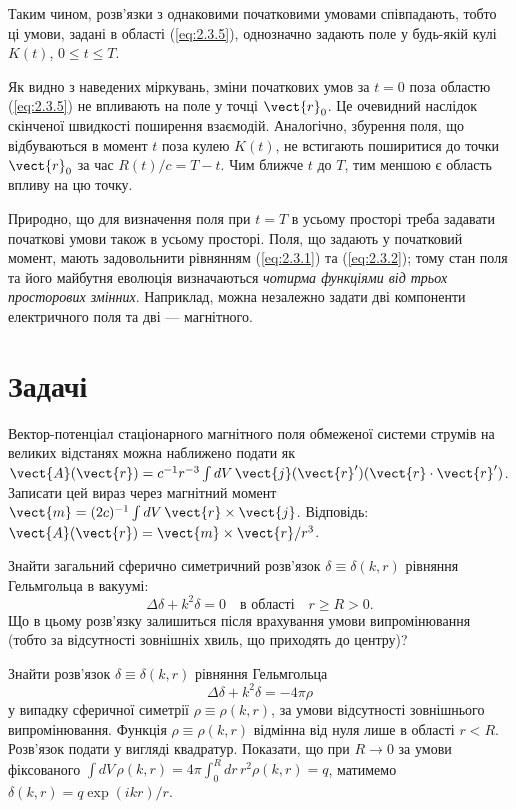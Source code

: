 Таким чином, розв’язки з однаковими початковими умовами співпадають, тобто ці умови, задані в області (\ref{eq:2.3.5}), однозначно задають поле у
будь-якій кулі \( K(t) \), \( 0 \leq t \leq T \).

Як видно з наведених міркувань, зміни початкових умов за \( t = 0 \) поза областю (\ref{eq:2.3.5}) не впливають на поле у точці \( \vect{r}_0 \). Це
очевидний наслідок скінченої швидкості поширення взаємодій. Аналогічно, збурення поля, що відбуваються в момент \( t \) поза кулею \( K(t) \), не
встигають поширитися до точки \( \vect{r}_0 \) за час \( R(t)/c = T - t \). Чим ближче \( t \) до \( T \), тим меншою є область впливу на цю точку.

Природно, що для визначення поля при \( t = T \) в усьому просторі треба задавати початкові умови також в усьому просторі. Поля, що задають у початковий
момент, мають задовольнити рівнянням (\ref{eq:2.3.1}) та (\ref{eq:2.3.2}); тому стан поля та його майбутня еволюція визначаються \emph{чотирма функціями
від трьох просторових змінних}. Наприклад, можна незалежно задати дві компоненти електричного поля та дві --- магнітного.

\section*{Задачі}

\begin{problem}%
Вектор-потенціал стаціонарного магнітного поля обмеженої системи струмів на великих відстанях можна наближено подати як \( \vect{A}(\vect{r}) =
c^{-1} r^{-3} \int dV \, \vect{j}(\vect{r}')(\vect{r} \cdot \vect{r}') \). Записати цей вираз через магнітний момент \( \vect{m} = (2c)^{-1} \int dV \,
\vect{r} \times \vect{j} \). Відповідь: \( \vect{A}(\vect{r}) = \vect{m} \times \vect{r} / r^3 \).
\end{problem}


\begin{problem}%
Знайти загальний сферично симетричний розв’язок \( \delta \equiv \delta(k, r) \) рівняння Гельмгольца в вакуумі:
\[
\Delta \delta + k^2 \delta = 0 \quad \text{в області} \quad r \geq R > 0.
\]
Що в цьому розв’язку залишиться після врахування умови випромінювання (тобто за відсутності зовнішніх хвиль, що приходять до центру)?
\end{problem}

\begin{problem}%
Знайти розв’язок \( \delta \equiv \delta(k, r) \) рівняння Гельмгольца
\begin{equation*}
   \Delta \delta + k^2 \delta = -4\pi\rho
\end{equation*}
у випадку сферичної симетрії \(
\rho \equiv \rho(k, r) \), за умови відсутності зовнішнього випромінювання. Функція \( \rho \equiv \rho(k, r) \) відмінна від нуля лише в області \( r <
R \). Розв’язок подати у вигляді квадратур. Показати, що при \( R \to 0 \) за умови фіксованого \( \int dV \, \rho(k, r) = 4\pi \int_0^R dr \, r^2
\rho(k, r) = q \), матимемо \( \delta(k, r) = q \exp(ikr) / r \).
\end{problem}

